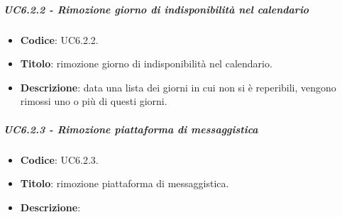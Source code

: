 			
	\subparagraph{UC6.2.2 - Rimozione giorno di indisponibilità nel calendario}
	\begin{itemize}
		\item \textbf{Codice}: UC6.2.2.
		\item \textbf{Titolo}: rimozione giorno di indisponibilità nel calendario.
		\item \textbf{Descrizione}: data una lista dei giorni in cui non si è reperibili, vengono rimossi uno o più di questi giorni.
	\end{itemize}
			
			
	\subparagraph{UC6.2.3 - Rimozione piattaforma di messaggistica}
	\begin{itemize}
		\item \textbf{Codice}: UC6.2.3.
		\item \textbf{Titolo}: rimozione piattaforma di messaggistica.
		\item \textbf{Descrizione}: 
	\end{itemize}


		
